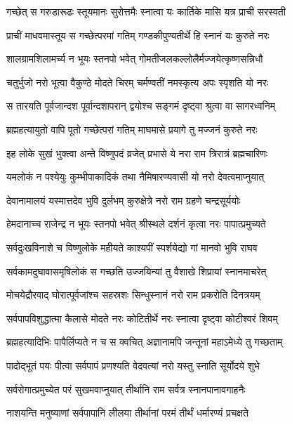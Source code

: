 \twolineshloka
{गच्छेत् स गरुडारूढः स्तूयमानः सुरोत्तमैः}
{स्नात्वा यः कार्तिके मासि यत्र प्राची सरस्वती}%

\twolineshloka
{प्राचीं माधवमास्तूय स गच्छेत्परमां गतिम्}
{गण्डकीपुण्यतीर्थे हि स्नानं यः कुरुते नरः}%

\twolineshloka
{शालग्रामशिलामर्च्य न भूयः स्तनपो भवेत्}
{गोमतीजलकल्लोलैर्मज्जयेत्कृष्णसन्निधौ}%

\twolineshloka
{चतुर्भुजो नरो भूत्वा वैकुण्ठे मोदते चिरम्}
{चर्मण्वतीं नमस्कृत्य अपः स्पृशति यो नरः}%

\twolineshloka
{स तारयति पूर्वजान्दश पूर्वान्दशापरान्}
{द्वयोश्च सङ्गमं दृष्ट्वा श्रुत्वा वा सागरध्वनिम्}%

\twolineshloka
{ब्रह्महत्यायुतो वापि पूतो गच्छेत्परां गतिम्}
{माघमासे प्रयागे तु मज्जनं कुरुते नरः}%

\twolineshloka
{इह लोके सुखं भुक्त्वा अन्ते विष्णुपदं व्रजेत्}
{प्रभासे ये नरा राम त्रिरात्रं ब्रह्मचारिणः}%

\twolineshloka
{यमलोकं न पश्येयुः कुम्भीपाकादिकं तथा}
{नैमिषारण्यवासी यो नरो देवत्वमाप्नुयात्}%

\twolineshloka
{देवानामालयं यस्मात्तदेव भुवि दुर्लभम्}
{कुरुक्षेत्रे नरो राम ग्रहणे चन्द्रसूर्ययोः}%

\twolineshloka
{हेमदानाच्च राजेन्द्र न भूयः स्तनपो भवेत्}
{श्रीस्थले दर्शनं कृत्वा नरः पापात्प्रमुच्यते}%

\twolineshloka
{सर्वदुःखविनाशे च विष्णुलोके महीयते}
{काश्यपीं स्पर्शयेद्यो गां मानवो भुवि राघव}%

\twolineshloka
{सर्वकामदुघावासमृषिलोकं स गच्छति}
{उज्जयिन्यां तु वैशाखे शिप्रायां स्नानमाचरेत्}%

\twolineshloka
{मोचयेद्रौरवाद् घोरात्पूर्वजांश्च सहस्रशः}
{सिन्धुस्नानं नरो राम प्रकरोति दिनत्रयम्}%

\twolineshloka
{सर्वपापविशुद्धात्मा कैलासे मोदते नरः}
{कोटितीर्थे नरः स्नात्वा दृष्ट्वा कोटीश्वरं शिवम्}%

\twolineshloka
{ब्रह्महत्यादिभिः पापैर्लिप्यते न च स क्वचित्}
{अज्ञानामपि जन्तूनां महाऽमेध्ये तु गच्छताम्}%

\twolineshloka
{पादोद्भूतं पयः पीत्वा सर्वपापं प्रणश्यति}
{वेदवत्यां नरो यस्तु स्नाति सूर्योदये शुभे}%

\twolineshloka
{सर्वरोगात्प्रमुच्येत परं सुखमवाप्नुयात्}
{तीर्थानि राम सर्वत्र स्नानपानावगाहनैः}%

\twolineshloka
{नाशयन्ति मनुष्याणां सर्वपापानि लीलया}
{तीर्थानां परमं तीर्थं धर्मारण्यं प्रचक्षते}%

